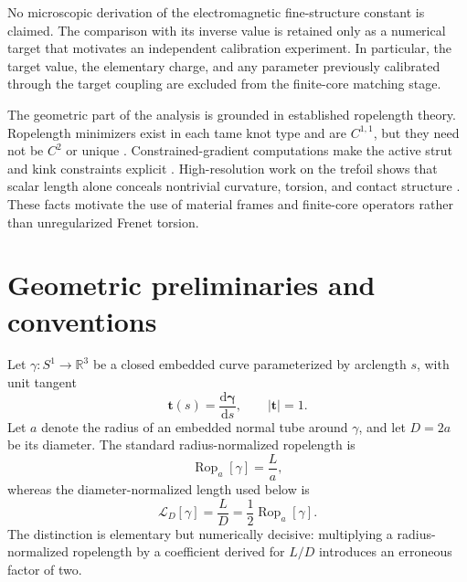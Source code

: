 \documentclass[aps,pre,preprint,notitlepage,nofootinbib,superscriptaddress]{revtex4-2}
\newcommand{\dd}{\mathrm d}
\newcommand{\RR}{\mathbb R}
\newcommand{\Rop}{\operatorname{Rop}}
\newcommand{\calL}{\mathcal L}
\begin{document}
No microscopic derivation of the electromagnetic fine-structure constant is claimed.  The comparison with its inverse value is retained only as a numerical target that motivates an independent calibration experiment.  In particular, the target value, the elementary charge, and any parameter previously calibrated through the target coupling are excluded from the finite-core matching stage.

The geometric part of the analysis is grounded in established ropelength theory.  Ropelength minimizers exist in each tame knot type and are $C^{1,1}$, but they need not be $C^2$ or unique \cite{CantarellaKusnerSullivan2002}.  Constrained-gradient computations make the active strut and kink constraints explicit \cite{AshtonCantarellaPiatekRawdon2011}.  High-resolution work on the trefoil shows that scalar length alone conceals nontrivial curvature, torsion, and contact structure \cite{PrzybylPieranski2014}.  These facts motivate the use of material frames and finite-core operators rather than unregularized Frenet torsion.

\section{Geometric preliminaries and conventions}
\label{sec:geometry}

Let $\gamma:S^1\to\RR^3$ be a closed embedded curve parameterized by arclength $s$, with unit tangent
\begin{equation}
  \bm t(s)=\frac{\dd\bm\gamma}{\dd s},\qquad |\bm t|=1.
\end{equation}
Let $a$ denote the radius of an embedded normal tube around $\gamma$, and let $D=2a$ be its diameter.  The standard radius-normalized ropelength is
\begin{equation}
  \Rop_a[\gamma]=\frac{L}{a},
\end{equation}
whereas the diameter-normalized length used below is
\begin{equation}
  \calL_D[\gamma]=\frac{L}{D}=\frac12\Rop_a[\gamma].
  \label{eq:diameter-normalized}
\end{equation}
The distinction is elementary but numerically decisive: multiplying a radius-normalized ropelength by a coefficient derived for $L/D$ introduces an erroneous factor of two.
\end{document}
